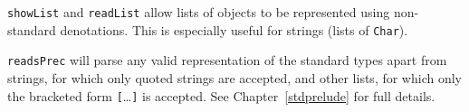 \mbox{\tt showList} and \mbox{\tt readList} allow lists of objects to be represented
using non-standard denotations.  This is especially useful for strings
(lists of \mbox{\tt Char}).




\mbox{\tt readsPrec} will parse any valid representation of the standard types 
apart from strings, for which only quoted strings are accepted, and other lists,
for which only the bracketed form \mbox{\tt [}\ldots\mbox{\tt ]} is accepted. See
Chapter~\ref{stdprelude} for full details.

